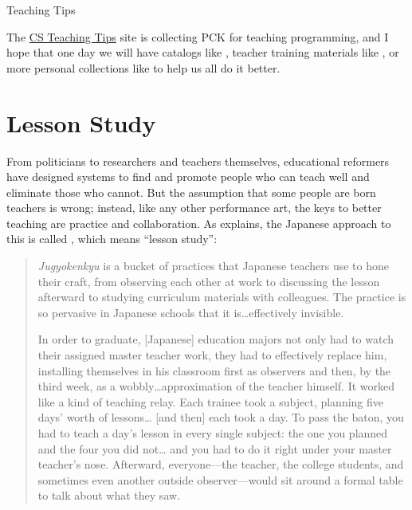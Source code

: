 \begin{callout}{Teaching Tips}

  The \href{http://csteachingtips.org/}{CS Teaching Tips} site is
  collecting PCK for teaching programming, and I hope that one day we
  will have catalogs like \cite{Ojos2015}, teacher training materials
  like \cite{Hazz2014,Guzd2015a,Sent2018}, or more personal
  collections like \cite{Gelm2002} to help us all do it better.

\end{callout}

\section{Lesson Study}\label{s:performance-jugyokenkyu}

From politicians to researchers and teachers themselves, educational
reformers have designed systems to find and promote people who can
teach well and eliminate those who cannot. But the assumption that
some people are born teachers is wrong; instead, like any other
performance art, the keys to better teaching are practice and
collaboration.  As \cite{Gree2014} explains, the Japanese approach to
this is called , which means
``lesson study'':

\begin{quote}

  \emph{Jugyokenkyu} is a bucket of practices that Japanese teachers
  use to hone their craft, from observing each other at work to
  discussing the lesson afterward to studying curriculum materials
  with colleagues. The practice is so pervasive in Japanese schools
  that it is{\ldots}effectively invisible.

  In order to graduate, {[}Japanese{]} education majors not only had
  to watch their assigned master teacher work, they had to effectively
  replace him, installing themselves in his classroom first as
  observers and then, by the third week, as a
  wobbly{\ldots}approximation of the teacher himself. It worked like a
  kind of teaching relay. Each trainee took a subject, planning five
  days' worth of lessons{\ldots} {[}and then{]} each took a day. To
  pass the baton, you had to teach a day's lesson in every single
  subject: the one you planned and the four you did not{\ldots} and
  you had to do it right under your master teacher's nose.  Afterward,
  everyone---the teacher, the college students, and sometimes even
  another outside observer---would sit around a formal table to talk
  about what they saw.

\end{quote}


